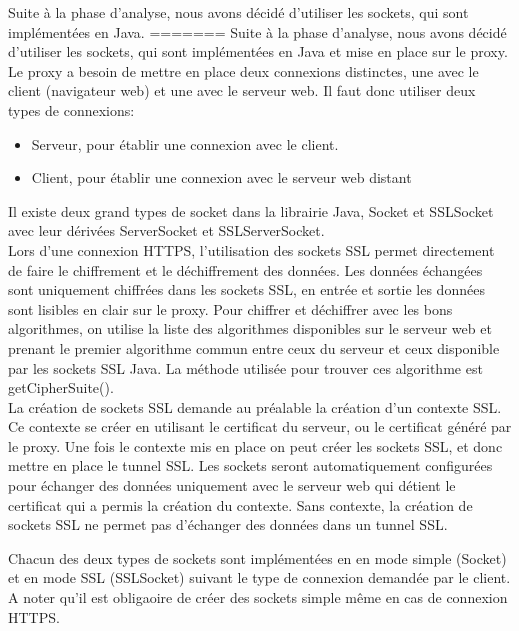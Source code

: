 \documentclass[a4paper,11pt,french]{report}
\begin{document}
Suite à la phase d'analyse, nous avons décidé d'utiliser les sockets, qui sont implémentées en Java.
=======
Suite à la phase d'analyse, nous avons décidé d'utiliser les sockets, qui sont implémentées en Java 
et mise en place sur le proxy. Le proxy a besoin de mettre en place deux 
connexions distinctes, une avec le client (navigateur web) et une avec le serveur web. Il faut donc utiliser 
deux types de connexions:
\begin{itemize}
  \item Serveur, pour établir une connexion avec le client.
  \item Client, pour établir une connexion avec le serveur web distant
\end{itemize}
Il existe deux grand types de socket dans la librairie Java, Socket et SSLSocket 
avec leur dérivées ServerSocket et SSLServerSocket.
~~\\
Lors d'une connexion HTTPS, l'utilisation des sockets SSL permet directement de 
faire le chiffrement et le déchiffrement des données. Les données échangées sont 
uniquement chiffrées dans les sockets SSL, en entrée et sortie les données sont 
lisibles en clair sur le proxy.
Pour chiffrer et déchiffrer avec les bons algorithmes, on utilise la liste des 
algorithmes disponibles sur le serveur web et prenant le premier algorithme 
commun entre ceux du serveur et ceux disponible par les sockets SSL Java.
La méthode utilisée pour trouver ces algorithme est getCipherSuite().
~~\\
La création de sockets SSL demande au préalable la création d'un contexte SSL. 
Ce contexte se créer en utilisant le certificat du serveur, ou le certificat 
généré par le proxy. Une fois le contexte mis en place on peut créer les sockets 
SSL, et donc mettre en place le tunnel SSL. Les sockets seront automatiquement configurées pour échanger des données 
uniquement avec le serveur web qui détient le certificat qui a permis la 
création du contexte.
Sans contexte, la création de sockets SSL ne permet pas d'échanger des données 
dans un tunnel SSL.

Chacun des deux types de sockets sont implémentées en en mode simple (Socket) et 
en mode SSL (SSLSocket) suivant le type de connexion demandée par le client. A 
noter qu'il est obligaoire de créer des sockets simple même en cas de connexion 
HTTPS.
\end{document}
